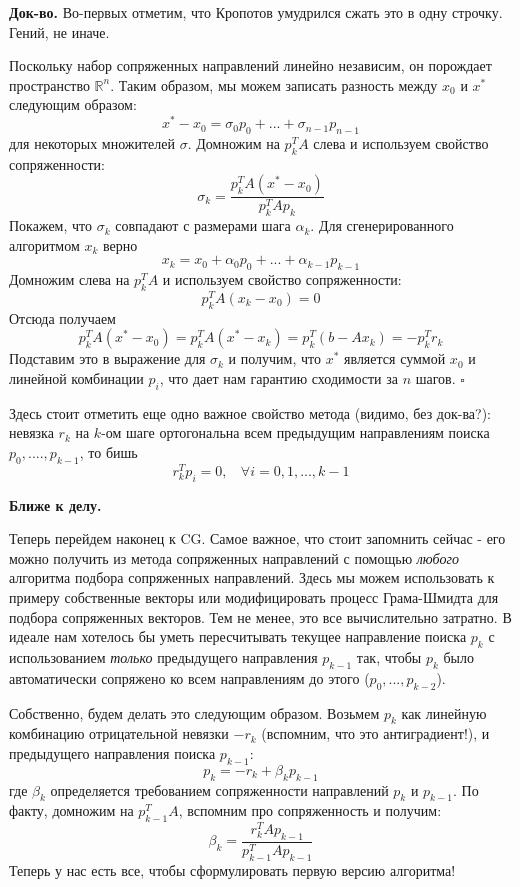     \textbf{Док-во.} Во-первых отметим, что Кропотов умудрился сжать это в одну строчку. Гений, не иначе.

    Поскольку набор сопряженных направлений линейно независим, он порождает пространство $\mathbb{R}^n$. Таким образом, мы можем записать разность между $x_0$ и $x^*$ следующим образом: $$x^* - x_0 = \sigma_0 p_0 + ... + \sigma_{n-1} p_{n-1}$$ для некоторых множителей $\sigma$. Домножим на $p_k^T A$ слева и используем свойство сопряженности: $$ \sigma_k = \frac{p_k^T A (x^* - x_0)}{p_k^T A p_k}$$ Покажем, что $\sigma_k$ совпадают с размерами шага $\alpha_k$. Для сгенерированного алгоритмом $x_k$ верно $$x_k = x_0 + \alpha_0 p_0 + ... + \alpha_{k-1} p_{k-1}$$ Домножим слева на $p_k^T A$ и используем свойство сопряженности: $$ p_k^T A (x_k - x_0) = 0$$ Отсюда получаем $$p_k^T A (x^* - x_0) = p_k^T A (x^* - x_k) = p_k^T (b - Ax_k) = -p_k^T r_k$$ Подставим это в выражение для $\sigma_k$ и получим, что $x^*$ является суммой $x_0$ и линейной комбинации $p_i$, что дает нам гарантию сходимости за $n$ шагов. $\square$

    Здесь стоит отметить еще одно важное свойство метода (видимо, без док-ва?): невязка $r_k$ на $k$-ом шаге ортогональна всем предыдущим направлениям поиска $p_0, ...., p_{k-1}$, то бишь $$r_k^T p_i = 0, \ \ \ \ \forall i = 0,1,...,k-1$$

    \textbf{Ближе к делу.}

    Теперь перейдем наконец к CG. Самое важное, что стоит запомнить сейчас - его можно получить из метода сопряженных направлений с помощью \textit{любого} алгоритма подбора сопряженных направлений. Здесь мы можем использовать к примеру собственные векторы или модифицировать процесс Грама-Шмидта для подбора сопряженных векторов. Тем не менее, это все вычислительно затратно. В идеале нам хотелось бы уметь пересчитывать текущее направление поиска $p_k$ с использованием \textit{только} предыдущего направления $p_{k-1}$ так, чтобы $p_k$ было автоматически сопряжено ко всем направлениям до этого ($p_0,...,p_{k-2}$).

    Собственно, будем делать это следующим образом. Возьмем $p_k$ как линейную комбинацию отрицательной невязки $-r_k$ (вспомним, что это антиградиент!), и предыдущего направления поиска $p_{k-1}$: $$p_k = -r_k + \beta_k p_{k-1}$$где $\beta_k$ определяется требованием сопряженности направлений $p_k$ и $p_{k-1}$. По факту, домножим на $p_{k-1}^T A$, вспомним про сопряженность и получим: $$\beta_k = \frac{r_k^T A p_{k-1}}{p_{k-1}^T A p_{k-1}}$$ Теперь у нас есть все, чтобы сформулировать первую версию алгоритма!

